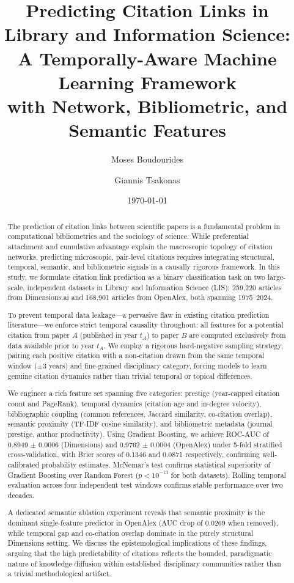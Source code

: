 \documentclass[12pt,a4paper]{article}
\title{\textbf{Predicting Citation Links in Library and Information Science:\\
A Temporally-Aware Machine Learning Framework\\
with Network, Bibliometric, and Semantic Features}}
\author[1]{Moses Boudourides}
\author[2]{Giannis Tsakonas}
\affil[1]{Department of Mathematics, University of Patras, Greece\\
  \texttt{m.boudourides@upatras.gr}}
\affil[2]{Library \& Information Center, University of Patras, Greece\\
  \texttt{gtsakonas@upatras.gr}}
\date{\today}
\begin{document}
\maketitle
\thispagestyle{empty}

\begin{abstract}
\noindent
The prediction of citation links between scientific papers is a fundamental problem
in computational bibliometrics and the sociology of science. While preferential
attachment and cumulative advantage explain the macroscopic topology of citation
networks, predicting microscopic, pair-level citations requires integrating
structural, temporal, semantic, and bibliometric signals in a causally rigorous
framework. In this study, we formulate citation link prediction as a binary
classification task on two large-scale, independent datasets in Library and
Information Science (LIS): 259,220 articles from Dimensions.ai and 168,901 articles
from OpenAlex, both spanning 1975--2024.

To prevent temporal data leakage---a pervasive flaw in existing citation prediction
literature---we enforce strict temporal causality throughout: all features for a
potential citation from paper $A$ (published in year $t_A$) to paper $B$ are
computed exclusively from data available prior to year $t_A$. We employ a rigorous
hard-negative sampling strategy, pairing each positive citation with a non-citation
drawn from the same temporal window ($\pm 3$ years) and fine-grained disciplinary
category, forcing models to learn genuine citation dynamics rather than trivial
temporal or topical differences.

We engineer a rich feature set spanning five categories: prestige (year-capped
citation count and PageRank), temporal dynamics (citation age and in-degree
velocity), bibliographic coupling (common references, Jaccard similarity, co-citation
overlap), semantic proximity (TF-IDF cosine similarity), and bibliometric metadata
(journal prestige, author productivity). Using Gradient Boosting, we achieve
ROC-AUC of 0.8949 $\pm$ 0.0006 (Dimensions) and 0.9762 $\pm$ 0.0004 (OpenAlex) under 5-fold stratified cross-validation, with Brier scores of 0.1346 and 0.0871 respectively, confirming well-calibrated probability estimates. McNemar's test confirms statistical superiority of Gradient Boosting over Random Forest ($p < 10^{-13}$ for both datasets). Rolling temporal evaluation across four independent test windows confirms stable performance over two decades.

A dedicated semantic ablation experiment reveals that semantic proximity is the
dominant single-feature predictor in OpenAlex (AUC drop of 0.0269 when removed), while temporal gap and co-citation overlap dominate in the purely structural Dimensions setting. We discuss the epistemological implications of these findings, arguing that the high predictability of citations reflects the bounded, paradigmatic nature of knowledge diffusion within established disciplinary communities rather than a trivial methodological artifact.
\end{abstract}
\end{document}
